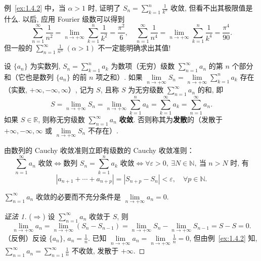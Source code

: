 \begin{remark}\label{rem:1.4.1}
例~\ref{ex:1.4.2} 中，当 $\alpha > 1$ 时, 证明了 $S_{n} = \sum\limits_{k=1}^{n}\frac{1}{k^{\alpha}}$ 收敛, 但看不出其极限值是什么. 以后, 应用 Fourier 级数可以得到
\[
\sum_{n=1}^{\infty}\frac{1}{n^{2}} = \lim_{n\to+\infty}\sum_{k=1}^{n}\frac{1}{k^{2}} = \frac{\pi^{2}}{6},\quad \sum_{n=1}^{\infty}\frac{1}{n^{4}} = \lim_{n\to+\infty}\sum_{k=1}^{n}\frac{1}{k^{4}} = \frac{\pi^{4}}{90}.
\]
但一般的 $\sum\limits_{n=1}^{\infty}\frac{1}{n^{\alpha}}\;(\alpha > 1)$ 不一定能明确求出其值!
\end{remark}

\begin{definition}\label{def:1.4.1}
设 $\{a_{n}\}$ 为实数列, $S_{n} = \sum\limits_{k=1}^{n} a_{k}$ 为数项（无穷）级数 $\sum\limits_{n=1}^{\infty} a_{n}$ 的第 $n$ 个部分和（它也是数列 $\{a_{n}\}$ 的前 $n$ 项之和）. 如果 $\lim\limits_{n \to +\infty} S_{n} = \lim\limits_{n \to +\infty} \sum\limits_{k=1}^{n} a_{k}$ 存在（实数, $+\infty, -\infty, \infty$）, 记为 $S$, 且称 $S$ 为无穷级数 $\sum\limits_{n=1}^{\infty} a_{n}$ 的和, 即
\[
S = \lim_{n\to+\infty}S_{n} = \lim_{n\to+\infty}\sum_{k=1}^{n}a_{k} = \sum_{k=1}^{\infty}a_{k} = \sum_{n=1}^{\infty}a_{n}.
\]
如果 $S \in \mathbb{R}$, 则称无穷级数 $\sum\limits_{n=1}^{\infty} a_{n}$ \textbf{收敛}. 否则称其为\textbf{发散}的（发散于 $+\infty, -\infty, \infty$ 或 $\lim\limits_{n \to +\infty} S_{n}$ 不存在）.

由数列的 Cauchy 收敛准则立即有级数的 Cauchy 收敛准则：
\[
\sum_{n=1}^{\infty}a_{n}\text{ 收敛} \iff \text{数列 } S_{n} = \sum_{k=1}^{n}a_{k}\text{ 收敛} \iff \forall\varepsilon>0,\ \exists N\in\mathbb{N},\ \text{当 } n>N \text{ 时, 有}
\]
\[
|a_{n+1} + \cdots + a_{n+p}| = |S_{n+p} - S_{n}| < \varepsilon,\quad \forall p\in\mathbb{N}.
\]
\end{definition}

\begin{theorem}\label{thm:1.4.1}
$\sum\limits_{n=1}^{\infty}a_{n}$ 收敛的必要而不充分条件是 $\lim\limits_{n\to+\infty}a_{n} = 0$.
\end{theorem}

\begin{proof}[证法 1]
($\Longrightarrow$) 设 $\sum\limits_{n=1}^{\infty}a_{n}$ 收敛于 $S$, 则
\[
\lim_{n\to+\infty}a_{n} = \lim_{n\to+\infty}(S_{n} - S_{n-1}) = \lim_{n\to+\infty}S_{n} - \lim_{n\to+\infty}S_{n-1} = S - S = 0.
\]
（反例）反设 $\{a_{n}\}$, $a_{n} = \frac{1}{n}$. 已知 $\lim\limits_{n \to +\infty} a_{n} = \lim\limits_{n \to +\infty} \frac{1}{n} = 0$, 但由例~\ref{ex:1.4.2} 知, $\sum\limits_{n=1}^{\infty} a_{n} = \sum\limits_{n=1}^{\infty} \frac{1}{n}$ 不收敛, 发散于 $+\infty$.
\end{proof}

